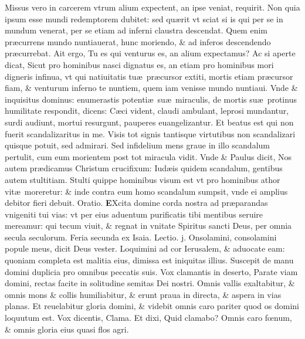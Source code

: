 \documentclass[a5paper,10pt]{book}
\def\ae{æ}
\def\oe{œ}
\begin{document}
\begin{multicols*}{2}
Missus vero in carcerem vtrum alium expectent, an ipse veniat, requirit.
Non quia ipsum esse mundi redemptorem dubitet: sed qu\ae rit vt sciat si is qui per se in mundum venerat, per se etiam ad inferni claustra descendat.
Quem enim pr\ae currens mundo nuntiauerat, hunc moriendo, \& ad inferos descendendo pr\ae currebat.
Ait ergo, Tu es qui venturus es, an alium expectamus?
Ac si aperte dicat, Sicut pro hominibus nasci dignatus es, an etiam pro hominibus mori digneris infinua, vt qui natiuitatis tu\ae \ pr\ae cursor extiti, mortis etiam pr\ae cursor fiam, \& venturum inferno te nuntiem, quem iam venisse mundo nuntiaui.
Vnde \& inquisitus dominus: enumerastis potenti\ae \ su\ae \ miraculis, de mortis su\ae \ protinus humilitate respondit, dicens: C\ae ci vident, claudi ambulant, leprosi mundantur, surdi audiunt, mortui resurgunt, pauperes euangelizantur.
Et beatus est qui non fuerit scandalizaritus in me.
Visis tot signis tantisque virtutibus non scandalizari quisque potuit, sed admirari.
Sed infidelium mens graue in illo scandalum pertulit, cum eum morientem post tot miracula vidit.
Vnde \& Paulus dicit, Nos autem pr\ae dicamus Christum crucifixum: Iud\ae is quidem scandalum, gentibus autem stultitiam.
Stulti quippe hominibus visum est vt pro hominibus athor vit\ae \ moreretur: \& inde contra eum homo scandalum sumpsit, vnde ei amplius debitor fieri debuit. \quad \color{red} Oratio. \color{black}
\vspace{-.25em}
\lettrine[lines=2]{\bfseries \color{red} E}{}Xcita domine corda nostra ad pr\ae parandas vnigeniti tui vias: vt per eius aduentum purificatis tibi mentibus seruire mereamur: qui tecum viuit, \& regnat in vnitate Spiritus sancti Deus, per omnia secula seculorum.
\newline {} \color{red} \hypertarget{MON-SECUNDA-ADV}{Feria secunda} ex Isaia. \hfill Lectio. j. \color{black}
\vspace{-.25em}
Onsolamini, consolamini popule meus, dicit Deus vester.
Loquimini ad cor Ierusalem, \& aduocate eam: quoniam completa est malitia eius, dimissa est iniquitas illius.
Suscepit de manu domini duplicia pro omnibus peccatis suis.
Vox clamantis in deserto, Parate viam domini, rectas facite in solitudine semitas Dei nostri.
Omnis vallis exaltabitur, \& omnis mons \& collis humiliabitur, \& erunt praua in directa, \& aspera in vias planas.
Et reuelabitur gloria domini, \& videbit omnis caro pariter quod os domini loquutum est.
Vox dicentis, Clama. Et dixi, Quid clamabo?
Omnis caro f\oe num, \& omnis gloria eius quasi flos agri.

\end{multicols*}
\end{document}
